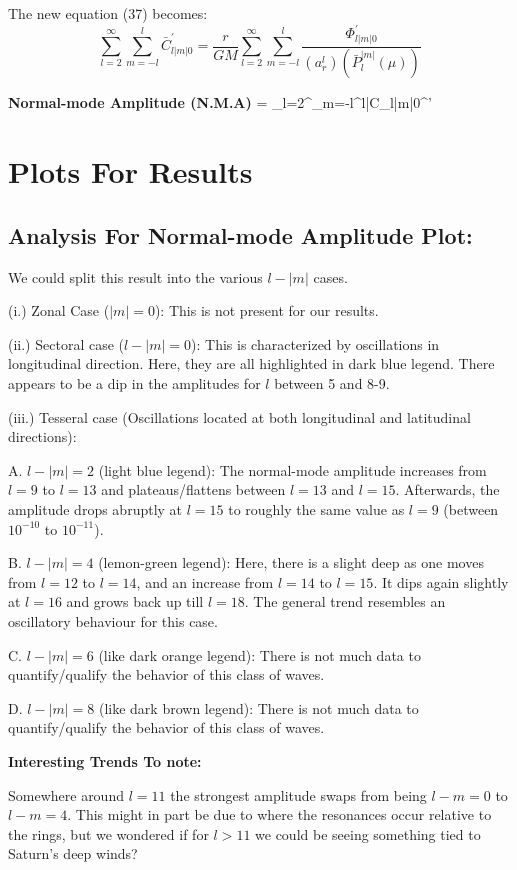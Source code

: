 \documentclass{article}
\begin{document}
The new equation (37) becomes: 
\begin{equation}
    \sum_{l=2}^{\infty}\sum_{m=-l}^{l}\bar{C}_{l|m|0}^{'} =\frac{r}{GM} \sum_{l=2}^{\infty}\sum_{m=-l}^{l}\frac{{\Phi}^{'}_{l|m|0}}{(a_{r}^{l})(\bar{P}_{l}^{|m|}(\mu))}
\end{equation}


\textbf{Normal-mode Amplitude (N.M.A)} = \sum_{l=2}^{\infty}\sum_{m=-l}^{l}\bar{C}_{l|m|0}^{'}

\section{Plots For Results}
\subsection{Analysis For Normal-mode Amplitude Plot:}
We could split this result into the various $l-|m|$ cases.

(i.) Zonal Case ($|m|=0$): This is not present for our results. 

(ii.) Sectoral case ($l-|m|=0$):
This is characterized by oscillations in longitudinal direction. Here, they are all highlighted in dark blue legend. There appears to be a dip in the amplitudes for $l$  between 5 and 8-9.

(iii.) Tesseral case (Oscillations located at both longitudinal and latitudinal directions):

A. $l-|m| = 2$ (light blue legend):
The normal-mode amplitude increases from $l=9$ to $l=13$ and plateaus/flattens between $l=13$ and $l=15$. Afterwards, the amplitude drops abruptly at $l=15$ to roughly the same value as $l=9$ (between $10^{-10}$ to $10^{-11}$). 

B. $l-|m| = 4$ (lemon-green legend):
Here, there is a slight deep as one moves from $l=12$ to $l=14$, and an increase from $l=14$ to $l=15$. It dips again slightly at $l=16$ and grows back up till $l=18$. The general trend resembles an oscillatory behaviour for this case.

C. $l-|m| = 6$ (like dark orange legend):
There is not much data to quantify/qualify the behavior of this class of waves.

D. $l-|m| = 8$ (like dark brown legend):
There is not much data to quantify/qualify the behavior of this class of waves.


\textbf{Interesting Trends To note:} 

Somewhere around $l=11$ the strongest amplitude swaps from being $l-m=0$ to $l-m=4$. This might in part be due to where the resonances occur relative to the rings, but we wondered if for $l>11$ we could be seeing something tied to Saturn's deep winds?
\end{document}
